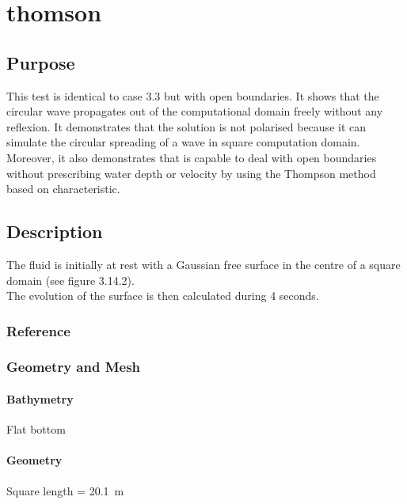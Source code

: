 \chapter{thomson}
%
%
\section{Purpose}
%
This test is identical to case 3.3 but with open boundaries.
It shows that the circular wave propagates out of the computational
domain freely without any reflexion.
It demonstrates that the  solution is not polarised because
it can simulate the circular spreading of a wave in square computation
domain.
Moreover, it also demonstrates that  is capable to deal
with open boundaries without prescribing water depth or velocity by
using the Thompson method based on characteristic.
%
\section{Description}
%
The fluid is initially at rest with a Gaussian free surface in the
centre of a square domain (see figure 3.14.2).\\
The evolution of the surface is then calculated during 4 seconds.
%
%
%
%
\subsection{Reference}
%

%
%
%
\subsection{Geometry and Mesh}
%
\subsubsection{Bathymetry}
%
Flat bottom
%
\subsubsection{Geometry}
%
Square length = 20.1~m
%
